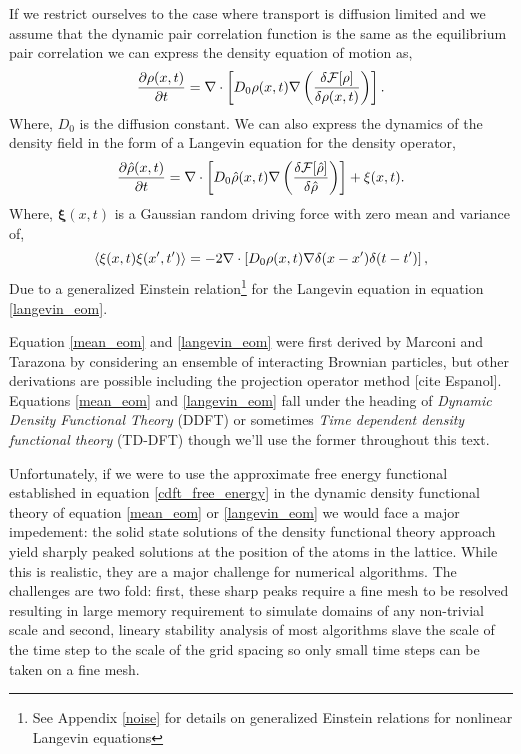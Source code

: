 {
    \color{ForestGreen}

If we restrict ourselves to the case where
transport is diffusion limited and we assume that the dynamic pair correlation
function is the same as the equilibrium pair correlation we can express the
density equation of motion as,
%
\begin{equation}
    \label{mean_eom}
    \frac{\partial \rho(x, t)}{\partial t} = 
        \nabla \cdot \left[
            D_0 \rho(x, t) \nabla \left(\frac{\delta \mathcal{F}[\rho]}{\delta \rho(x, t)}\right)
        \right].
\end{equation}
%
Where, $D_0$ is the diffusion constant. We can also express the dynamics of
the density field in the form of a Langevin equation for the density operator,
%
\begin{equation}
    \label{langevin_eom}
    \frac{\partial \hat{\rho}(x, t)}{\partial t} =
        \nabla \cdot \left[
            D_0 \hat{\rho}(x, t) \nabla \left(\frac{\delta \mathcal{F}[\hat{\rho}]}{\delta \hat{\rho}}\right)
        \right] + \xi(x, t).
\end{equation}
%
Where, $\mathbf{\xi}(x, t)$ is a Gaussian random driving force with zero mean
and variance of,
%
\begin{equation}
    \left\langle \xi(x, t)\xi(x^\prime, t^\prime) \right\rangle = -2 \nabla \cdot \left[ D_0 \rho(x,t) 
        \nabla \delta(x - x^\prime) \delta(t - t^\prime)
    \right],
\end{equation}
%
Due to a generalized Einstein relation\footnote{See Appendix \ref{noise} for
details on generalized Einstein relations for nonlinear Langevin equations} for
the Langevin equation in equation \ref{langevin_eom}.

Equation \ref{mean_eom} and \ref{langevin_eom} were first derived by Marconi
and Tarazona by considering an ensemble of interacting Brownian particles, but
other derivations are possible including the projection operator method [cite
Espanol].  Equations \ref{mean_eom} and \ref{langevin_eom} fall under the
heading of \textit{Dynamic Density Functional Theory} (DDFT) or sometimes
\textit{Time dependent density functional theory} (TD-DFT) though we'll use the
former throughout this text.
}

Unfortunately, if we were to use the approximate free energy functional
established in equation \ref{cdft_free_energy} in the dynamic density
functional theory of equation \ref{mean_eom} or \ref{langevin_eom} we would
face a major impedement: the solid state solutions of the density functional
theory approach yield sharply peaked solutions at the position of the atoms in
the lattice. While this is realistic, they are a major challenge for numerical
algorithms. The challenges are two fold: first, these sharp peaks require a fine mesh 
to be resolved resulting in large memory requirement to simulate domains 
of any non-trivial scale and second, lineary stability analysis of most algorithms 
slave the scale of the time step to the scale of the grid spacing so only small
time steps can be taken on a fine mesh.


